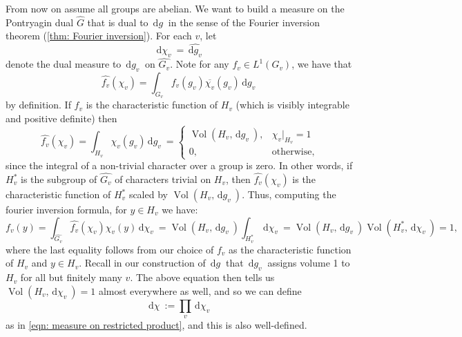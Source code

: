 \documentclass[11pt, x11names, openany]{book}
\renewcommand{\bar}[1]{\overline{#1}}
\renewcommand{\hat}{\widehat}
\newcommand{\dg}{\, \mathrm{d}g \ }
\renewcommand{\d}[1]{\, \mathrm{d}#1 \ }
\DeclareMathOperator{\vol}{Vol}
\begin{document}
From now on assume all groups are abelian. We want to build a measure on the Pontryagin dual $\hat{G}$ that is dual to $\dg$ in the sense of the Fourier inversion theorem (\ref{thm: Fourier inversion}). For each $v$, let
\begin{equation*}
    \d{\chi_v} = \hat{\d{g_v}}
\end{equation*}
denote the dual measure to $\d{g_v}$ on $\hat{G_v}$. Note for any $f_v \in L^1(G_v)$, we have that
\begin{equation*}
    \hat{f_v}(\chi_v) = \int_{G_v} f_v(g_v)\bar{\chi_v}(g_v)\d{g_v}
\end{equation*}
by definition. If $f_v$ is the characteristic function of $H_v$ (which is visibly integrable and positive definite) then 
\begin{equation*}
    \hat{f_v}(\chi_v) = \int_{H_v} \chi_v(g_v)\d{g_v} = \begin{cases}
        \vol(H_v, \d{g_v}), & \chi_v \vert_{H_v} = 1\\
        0, & \text{otherwise,}
    \end{cases}
\end{equation*}
since the integral of a non-trivial character over a group is zero. In other words, if $H_v^*$ is the subgroup of $\hat{G_v}$ of characters trivial on $H_v$, then $\hat{f_v}(\chi_v)$ is the characteristic function of $H^*_v$ scaled by $\vol(H_v, \d{g_v})$. Thus, computing the fourier inversion formula, for $y \in H_v$ we have:
\begin{equation*}
    f_v(y) = \int_{\hat{G_v}} \hat{f_v}(\chi_v) \chi_v(y) \d{\chi_v} = \vol(H_v, \d{g_v}) \int_{H^*_v} \d{\chi_v} = \vol(H_v, \d{g_v}) \vol(H^*_v, \d{\chi_v}) = 1,
\end{equation*}
where the last equality follows from our choice of $f_v$ as the characteristic function of $H_v$ and $y \in H_v$. Recall in our construction of $\dg$ that $\d{g_v}$ assigns volume 1 to $H_v$ for all but finitely many $v$. The above equation then tells us $\vol(H_v, \d{\chi_v}) = 1$ almost everywhere as well, and so we can define
\begin{equation}
    \label{eqn: dual measure on restricted product}
    \d{\chi} := \prod_v \d{\chi_v}
\end{equation}
as in \ref{eqn: measure on restricted product}, and this is also well-defined.
\end{document}
